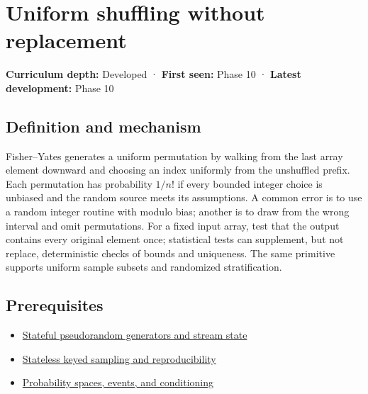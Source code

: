 \hypertarget{appendix-184fcc411663}{}\label{referencestart:appendix-184fcc411663}
\section{Uniform shuffling without replacement}\label{appendix-184fcc411663-uniform-shuffling-without-replacement}

\textbf{Curriculum depth:} Developed · \textbf{First seen:} Phase 10 · \textbf{Latest development:} Phase 10

\begin{allmightroledefinition}

\subsection{Definition and mechanism}\label{appendix-184fcc411663-definition-and-mechanism}

Fisher--Yates generates a uniform permutation by walking from the last array element downward and choosing an index uniformly from the unshuffled prefix. Each permutation has probability \(1/n!\) if every bounded integer choice is unbiased and the random source meets its assumptions. A common error is to use a random integer routine with modulo bias; another is to draw from the wrong interval and omit permutations. For a fixed input array, test that the output contains every original element once; statistical tests can supplement, but not replace, deterministic checks of bounds and uniqueness. The same primitive supports uniform sample subsets and randomized stratification.

\end{allmightroledefinition}

\subsection{Prerequisites}\label{appendix-184fcc411663-prerequisites}

\begin{itemize}
\tightlist
\item
  \hyperref[appendix-e0f7c7e08f3a]{Stateful pseudorandom generators and stream state}
\item
  \hyperref[appendix-daaf25bfd3a0]{Stateless keyed sampling and reproducibility}
\item
  \hyperref[appendix-f1ef323f6ed7]{Probability spaces, events, and conditioning}
\end{itemize}

